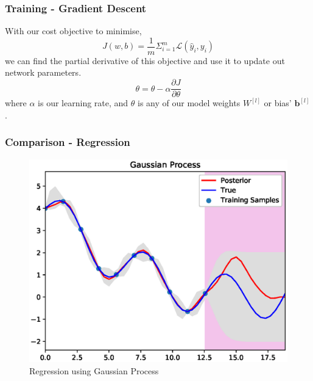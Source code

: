\documentclass{beamer}
\newcommand{\mb}[1]{\mathbf{#1}}
\begin{document}
% 
% 
% 
% 
\begin{frame}
  \frametitle{Training - Gradient Descent}
  With our cost objective to minimise,
  \begin{equation*}
    J(w,b) =\frac{1}{m} \Sigma_{i=1}^{m}\mathcal{L}(\hat{y}_i, y_i)
  \end{equation*}
  we can find the partial derivative of this objective and use it to update out network parameters.
  \begin{equation*}
    \theta = \theta - \alpha \dfrac{\partial J}{\partial \theta}
  \end{equation*}
  where $\alpha$ is our learning rate, and $\theta$ is any of our model weights $W^{[l]}$ or bias' $\mb{b}^{[l]}$.
\end{frame}
% 
% 
% 
% 
\begin{frame}
  \frametitle{Comparison - Regression}
  \vspace*{-0.15cm}
  \begin{figure}[!h]
    \centering
    \includegraphics[width=0.8\linewidth]{./figs/gp.eps}
    \caption{Regression using Gaussian Process}
    \label{fig:gp}
  \end{figure}
\end{frame}
% 
% 
% 
% 
\end{document}
